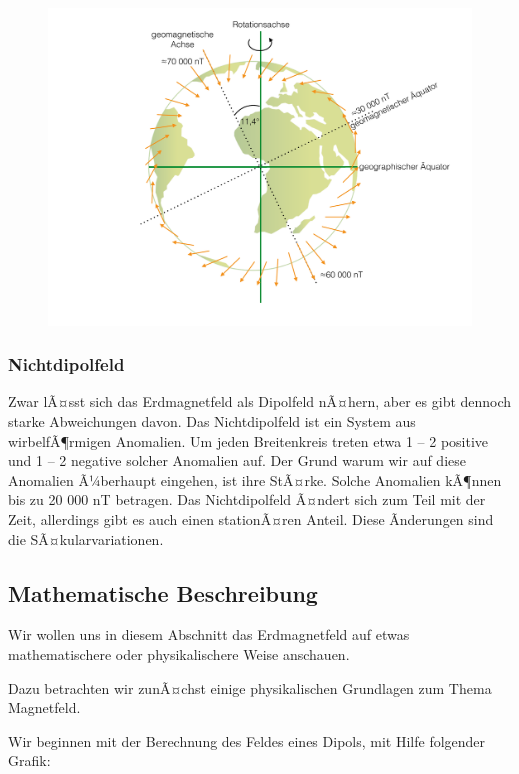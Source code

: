 \begin{figure}[H]
	\centering
	\includegraphics[width = \textwidth]{MagnetikBilder/Dipolfeld}
\end{figure}


\subsubsection{Nichtdipolfeld}
Zwar lÃ¤sst sich das Erdmagnetfeld als Dipolfeld nÃ¤hern, aber es gibt dennoch starke Abweichungen davon. Das Nichtdipolfeld ist ein System aus wirbelfÃ¶rmigen Anomalien. Um jeden Breitenkreis treten etwa 1 -- 2 positive und 1 -- 2 negative solcher Anomalien auf. Der Grund warum wir auf diese Anomalien Ã¼berhaupt eingehen, ist ihre StÃ¤rke. Solche Anomalien kÃ¶nnen bis zu 20 000 nT betragen. Das Nichtdipolfeld Ã¤ndert sich zum Teil mit der Zeit, allerdings gibt es auch einen stationÃ¤ren Anteil. Diese Ãnderungen sind die SÃ¤kularvariationen.



\subsection{Mathematische Beschreibung}
Wir wollen uns in diesem Abschnitt das Erdmagnetfeld auf etwas mathematischere oder physikalischere Weise anschauen.

Dazu betrachten wir zunÃ¤chst einige physikalischen Grundlagen zum Thema Magnetfeld. 

Wir beginnen mit der Berechnung des Feldes eines Dipols, mit Hilfe folgender Grafik:


